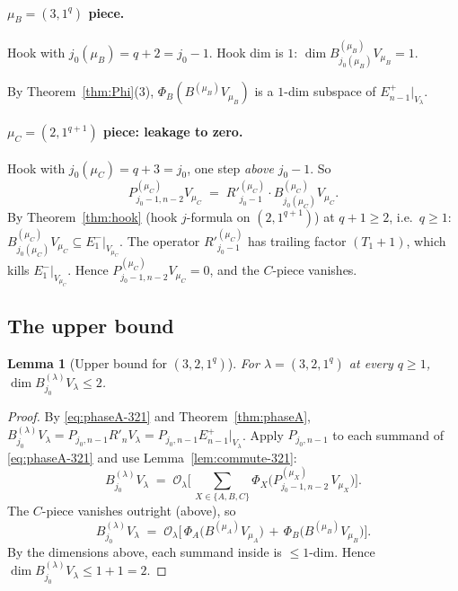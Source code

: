 \documentclass[11pt]{article}
\newtheorem{lemma}[theorem]{Lemma}
\theoremstyle{definition}
\begin{document}
\paragraph{$\mu_B = (3, 1^q)$ piece.}
Hook with $j_0(\mu_B) = q + 2 = j_0 - 1$. Hook dim is $1$:
$\dim B^{(\mu_B)}_{j_0(\mu_B)} V_{\mu_B} = 1$.

By Theorem~\ref{thm:Phi}(3), $\Phi_B(B^{(\mu_B)} V_{\mu_B})$ is a
$1$-dim subspace of $E_{n-1}^+|_{V_\lambda}$.

\paragraph{$\mu_C = (2, 1^{q+1})$ piece: leakage to zero.}
Hook with $j_0(\mu_C) = q + 3 = j_0$, one step \emph{above} $j_0 - 1$.
So
\[
   P^{(\mu_C)}_{j_0 - 1, n - 2} V_{\mu_C}
   \;=\; R'^{(\mu_C)}_{j_0 - 1} \cdot B^{(\mu_C)}_{j_0(\mu_C)} V_{\mu_C}.
\]
By Theorem~\ref{thm:hook} (hook $j$-formula on $(2, 1^{q+1})$) at
$q + 1 \ge 2$, i.e.\ $q \ge 1$:
$B^{(\mu_C)}_{j_0(\mu_C)} V_{\mu_C} \subseteq E_1^-|_{V_{\mu_C}}$.
The operator $R'^{(\mu_C)}_{j_0 - 1}$ has trailing factor $(T_1{+}1)$,
which kills $E_1^-|_{V_{\mu_C}}$. Hence
$P^{(\mu_C)}_{j_0 - 1, n - 2} V_{\mu_C} = 0$, and the $C$-piece
vanishes.

\subsection{The upper bound}

\begin{lemma}[Upper bound for $(3, 2, 1^q)$]\label{lem:UB-321}
For $\lambda = (3, 2, 1^q)$ at every $q \ge 1$,
$\dim B^{(\lambda)}_{j_0} V_\lambda \le 2$.
\end{lemma}

\begin{proof}
By \eqref{eq:phaseA-321} and Theorem~\ref{thm:phaseA},
$B^{(\lambda)}_{j_0} V_\lambda = P_{j_0, n-1} R'_n V_\lambda =
P_{j_0, n-1} E_{n-1}^+|_{V_\lambda}$. Apply $P_{j_0, n-1}$ to each
summand of \eqref{eq:phaseA-321} and use
Lemma~\ref{lem:commute-321}:
\[
   B^{(\lambda)}_{j_0} V_\lambda
   \;=\;
   \mathcal{O}_\lambda
   \Big[\,
   \sum_{X \in \{A, B, C\}}
   \Phi_X\!\big(P^{(\mu_X)}_{j_0 - 1, n - 2}\, V_{\mu_X}\big)
   \Big].
\]
The $C$-piece vanishes outright (above), so
\[
   B^{(\lambda)}_{j_0} V_\lambda
   \;=\;
   \mathcal{O}_\lambda
   \Big[\,
   \Phi_A\!\big(B^{(\mu_A)} V_{\mu_A}\big)
   \,+\, \Phi_B\!\big(B^{(\mu_B)} V_{\mu_B}\big)
   \Big].
\]
By the dimensions above, each summand inside is $\le 1$-dim. Hence
$\dim B^{(\lambda)}_{j_0} V_\lambda \le 1 + 1 = 2$.
\end{proof}
\end{document}
